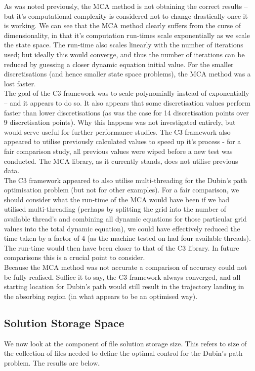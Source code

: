 \documentclass[11pt,draftd]{article}
\begin{document}
As was noted previously, the MCA method is not obtaining the correct results -- but it's computational complexity is considered not to change drastically once it is working. We can see that the MCA method clearly suffers from the curse of dimensionality, in that it's computation run-times scale exponentially as we scale the state space. The run-time also scales linearly with the number of iterations used; but ideally this would converge, and thus the number of iterations can be reduced by guessing a closer dynamic equation initial value. For the smaller discretisations (and hence smaller state space problems), the MCA method was a lost faster. \\

The goal of the C3 framework was to scale polynomially instead of exponentially -- and it appears to do so. It also appears that some discretisation values perform faster than lower discretisations (as was the case for 14 discretisation points over 9 discretisation points). Why this happens was not investigated entirely, but would serve useful for further performance studies. The C3 framework also appeared to utilise previously calculated values to speed up it's process - for a fair comparison study, all previous values were wiped before a new test was conducted. The MCA library, as it currently stands, does not utilise previous data. \\

The C3 framework appeared to also utilise multi-threading for the Dubin's path optimisation problem (but not for other examples). For a fair comparison, we should consider what the run-time of the MCA would have been if we had utilised multi-threading (perhaps by splitting the grid into the number of available thread's and combining all dynamic equations for those particular grid values into the total dynamic equation), we could have effectively reduced the time taken by a factor of 4 (as the machine tested on had four available threads). The run-time would then have been closer to that of the C3 library. In future comparisons this is a crucial point to consider. \\

Because the MCA method was not accurate a comparison of accuracy could not be fully realised. Suffice it to say, the C3 framework always converged, and all starting location for Dubin's path would still result in the trajectory landing in the absorbing region (in what appears to be an optimised way).

\subsection{Solution Storage Space}
We now look at the component of file solution storage size. This refers to size of the collection of files needed to define the optimal control for the Dubin's path problem. The results are below.
\end{document}
